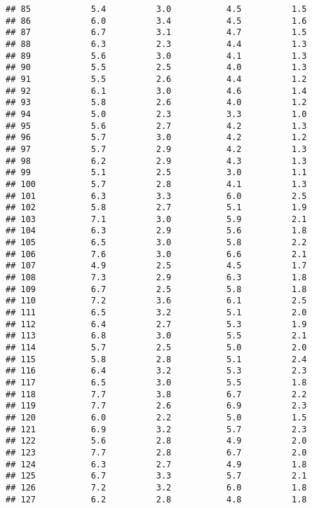 \documentclass[
]{article}
\begin{document}
\begin{verbatim}
## 85            5.4          3.0           4.5          1.5
## 86            6.0          3.4           4.5          1.6
## 87            6.7          3.1           4.7          1.5
## 88            6.3          2.3           4.4          1.3
## 89            5.6          3.0           4.1          1.3
## 90            5.5          2.5           4.0          1.3
## 91            5.5          2.6           4.4          1.2
## 92            6.1          3.0           4.6          1.4
## 93            5.8          2.6           4.0          1.2
## 94            5.0          2.3           3.3          1.0
## 95            5.6          2.7           4.2          1.3
## 96            5.7          3.0           4.2          1.2
## 97            5.7          2.9           4.2          1.3
## 98            6.2          2.9           4.3          1.3
## 99            5.1          2.5           3.0          1.1
## 100           5.7          2.8           4.1          1.3
## 101           6.3          3.3           6.0          2.5
## 102           5.8          2.7           5.1          1.9
## 103           7.1          3.0           5.9          2.1
## 104           6.3          2.9           5.6          1.8
## 105           6.5          3.0           5.8          2.2
## 106           7.6          3.0           6.6          2.1
## 107           4.9          2.5           4.5          1.7
## 108           7.3          2.9           6.3          1.8
## 109           6.7          2.5           5.8          1.8
## 110           7.2          3.6           6.1          2.5
## 111           6.5          3.2           5.1          2.0
## 112           6.4          2.7           5.3          1.9
## 113           6.8          3.0           5.5          2.1
## 114           5.7          2.5           5.0          2.0
## 115           5.8          2.8           5.1          2.4
## 116           6.4          3.2           5.3          2.3
## 117           6.5          3.0           5.5          1.8
## 118           7.7          3.8           6.7          2.2
## 119           7.7          2.6           6.9          2.3
## 120           6.0          2.2           5.0          1.5
## 121           6.9          3.2           5.7          2.3
## 122           5.6          2.8           4.9          2.0
## 123           7.7          2.8           6.7          2.0
## 124           6.3          2.7           4.9          1.8
## 125           6.7          3.3           5.7          2.1
## 126           7.2          3.2           6.0          1.8
## 127           6.2          2.8           4.8          1.8

\end{verbatim}
\end{document}
